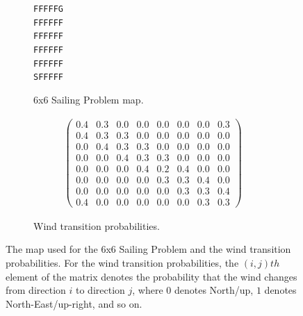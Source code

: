         \begin{figure}
             \centering
             \begin{subfigure}[b]{0.49\textwidth}
                 \centering
                 \texttt{FFFFFG} \\
                 \texttt{FFFFFF} \\
                 \texttt{FFFFFF} \\
                 \texttt{FFFFFF} \\
                 \texttt{FFFFFF} \\
                 \texttt{SFFFFF} 
                 \caption{6x6 Sailing Problem map.}
             \end{subfigure}
             \hfill
             \begin{subfigure}[b]{0.49\textwidth}
                 \centering
                 \begin{align*}
                     \begin{pmatrix}
                        0.4 & 0.3 & 0.0 & 0.0 & 0.0 & 0.0 & 0.0 & 0.3 \\
                        0.4 & 0.3 & 0.3 & 0.0 & 0.0 & 0.0 & 0.0 & 0.0 \\
                        0.0 & 0.4 & 0.3 & 0.3 & 0.0 & 0.0 & 0.0 & 0.0 \\
                        0.0 & 0.0 & 0.4 & 0.3 & 0.3 & 0.0 & 0.0 & 0.0 \\
                        0.0 & 0.0 & 0.0 & 0.4 & 0.2 & 0.4 & 0.0 & 0.0 \\
                        0.0 & 0.0 & 0.0 & 0.0 & 0.3 & 0.3 & 0.4 & 0.0 \\
                        0.0 & 0.0 & 0.0 & 0.0 & 0.0 & 0.3 & 0.3 & 0.4 \\
                        0.4 & 0.0 & 0.0 & 0.0 & 0.0 & 0.0 & 0.3 & 0.3 
                     \end{pmatrix}
                 \end{align*}
                 \caption{Wind transition probabilities.}
             \end{subfigure}
                \caption{The map used for the 6x6 Sailing Problem and the wind transition probabilities. For the wind transition probabilities, the $(i,j)th$ element of the matrix denotes the probability that the wind changes from direction $i$ to direction $j$, where $0$ denotes North/up, $1$ denotes North-East/up-right, and so on.}
                \label{fig:sailing_deets}
        \end{figure}


